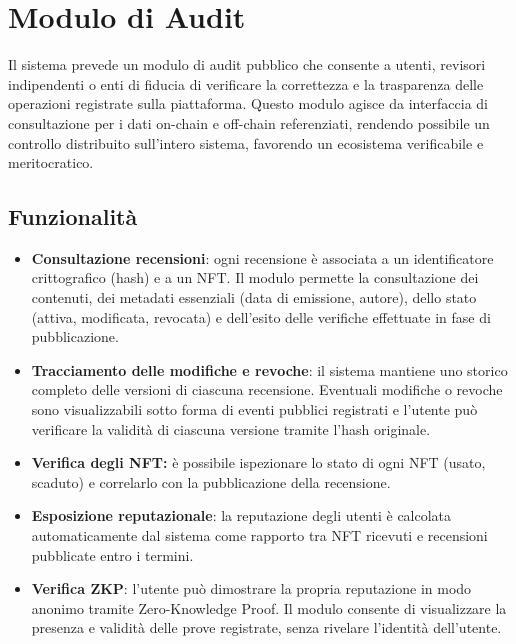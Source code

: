     \section{Modulo di Audit}
        Il sistema prevede un modulo di audit pubblico che consente a utenti, revisori indipendenti o enti di fiducia di verificare la correttezza e la trasparenza delle operazioni registrate sulla piattaforma. Questo modulo agisce da interfaccia di consultazione per i dati on-chain e off-chain referenziati, rendendo possibile un controllo distribuito sull'intero sistema, favorendo un ecosistema verificabile e meritocratico.
        
        \subsection{Funzionalità}
            \begin{itemize}
                \item \textbf{Consultazione recensioni}: ogni recensione è associata a un identificatore crittografico (hash) e a un NFT. Il modulo permette la consultazione dei contenuti, dei metadati essenziali (data di emissione, autore), dello stato (attiva, modificata, revocata) e dell'esito delle verifiche effettuate in fase di pubblicazione.

                \item \textbf{Tracciamento delle modifiche e revoche}: il sistema mantiene uno storico completo delle versioni di ciascuna recensione. Eventuali modifiche o revoche sono visualizzabili sotto forma di eventi pubblici registrati e l'utente può verificare la validità di ciascuna versione tramite l’hash originale.
                
                \item \textbf{Verifica degli NFT:} è possibile ispezionare lo stato di ogni NFT (usato, scaduto) e correlarlo con la pubblicazione della recensione.
                
                \item \textbf{Esposizione reputazionale}: la reputazione degli utenti è calcolata automaticamente dal sistema come rapporto tra NFT ricevuti e recensioni pubblicate entro i termini.
                
                \item \textbf{Verifica ZKP}: l'utente può dimostrare la propria reputazione in modo anonimo tramite Zero-Knowledge Proof. Il modulo consente di visualizzare la presenza e validità delle prove registrate, senza rivelare l'identità dell'utente.
                

\end{itemize}
